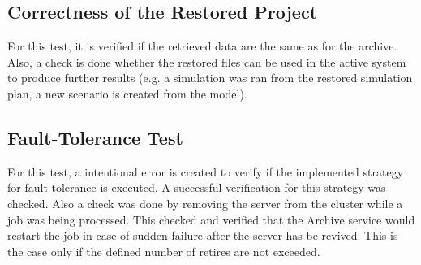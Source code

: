 \subsection{Correctness of the Restored Project}
For this test, it is verified if the retrieved data are the same as for the archive. Also, a check is done whether the restored files can be used in the active system
to produce further results (e.g. a simulation was ran from the restored simulation plan, a new scenario is created from the model).

\subsection{Fault-Tolerance Test}
For this test, a intentional error is created to verify if the implemented strategy for fault tolerance is executed. A successful verification for this
strategy was checked. Also a check was done by removing the server from the cluster while a job was being processed. This checked and verified that the Archive service
would restart the job in case of sudden failure after the server has be revived. This is the case only if the defined number of retires are not exceeded.